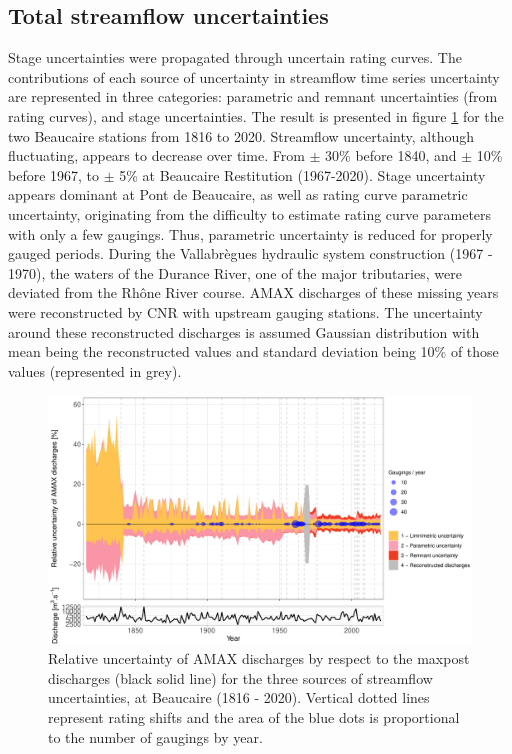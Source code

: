 \documentclass[11pt]{article}
\begin{document}
    \subsection{Total streamflow uncertainties}
    
    Stage uncertainties were propagated through uncertain rating curves. The contributions of each source of uncertainty in streamflow time series uncertainty are represented in three categories: parametric and remnant uncertainties (from rating curves), and stage uncertainties. The result is presented in figure \ref{fig:ICtot_both} for the two Beaucaire stations from 1816 to 2020. Streamflow uncertainty, although fluctuating, appears to decrease over time. From $\pm$ 30\% before 1840, and $\pm$ 10\% before 1967, to $\pm$ 5\% at Beaucaire Restitution (1967-2020). Stage uncertainty appears dominant at Pont de Beaucaire, as well as rating curve parametric uncertainty, originating from the difficulty to estimate rating curve parameters with only a few gaugings. Thus, parametric uncertainty is reduced for properly gauged periods. During the Vallabrègues hydraulic system construction (1967 - 1970), the waters of the Durance River, one of the major tributaries, were deviated from the Rhône River course. AMAX discharges of these missing years were reconstructed by CNR with upstream gauging stations. The uncertainty around these reconstructed discharges is assumed Gaussian distribution with mean being the reconstructed values and standard deviation being 10\% of those values (represented in grey).
    
    \begin{figure}[h!]
        \centering
        \includegraphics[width=\textwidth]{Figs/9-IcAndAMAX.pdf}
        \caption{Relative uncertainty of AMAX discharges by respect to the maxpost discharges (black solid line) for the three sources of streamflow uncertainties, at Beaucaire (1816 - 2020). Vertical dotted lines represent rating shifts and the area of the blue dots is proportional to the number of gaugings by year.}
        \label{fig:ICtot_both}
    \end{figure}
    
\end{document}
